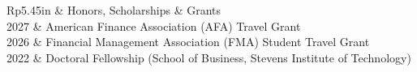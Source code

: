 \documentclass[letterpaper, 11pt]{article}
\newcommand{\headingfont}{\Large\color{OliveGreen}}
\newenvironment{SectionTable}[1]{
	\renewcommand*{\arraystretch}{1.55}
	\setlength{\tabcolsep}{10pt}
	\begin{longtable}{Rp{5.45in}} & #1 \\}
{\end{longtable}\vspace{-.3cm}}
\newenvironment{SectionTableSingleSpace}[1]{
	\renewcommand*{\arraystretch}{1.15}
	\setlength{\tabcolsep}{10pt}
	\begin{longtable}{Rp{5.45in}} & #1 \\[0.6em]}
{\end{longtable}\vspace{-.3cm}}
\begin{document}

\begin{SectionTableSingleSpace}{\headingfont Honors, Scholarships \& Grants}
2027 &
American Finance Association (AFA) Travel Grant \\

2026 &
Financial Management Association (FMA) Student Travel Grant \\

2022 &
Doctoral Fellowship (School of Business, Stevens Institute of Technology)
\end{SectionTableSingleSpace}







\end{document}

